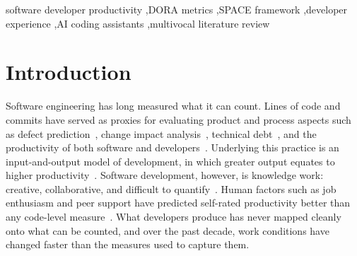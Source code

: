 \documentclass[preprint,number]{elsarticle}
\begin{document}
\begin{frontmatter}
\begin{abstract}
\noindent\textit{\textbf{Conclusion:}}
Across the decade, what changed is less which framework is used than what is measured alongside output. No single framework appears to cover all dimensions of developer productivity. Future studies, especially of AI-assisted work, could combine delivery, perception, and experience measures at the individual, team, and system levels. Validated DevEx instruments, longitudinal designs, and evidence on the team- and system-level effects of AI assistants are still needed.
\end{abstract}

\begin{keyword}
software developer productivity \sep DORA metrics \sep SPACE framework \sep developer experience \sep AI coding assistants \sep multivocal literature review
\end{keyword}

\end{frontmatter}

\linenumbers  %

\section{Introduction}
\label{sec:introduction}

Software engineering has long measured what it can count. Lines of code and commits have served as proxies for evaluating product and process aspects such as defect prediction~\cite{basili1996validation, nagappan2005churn, zimmermann2007predicting}, change impact analysis~\cite{bohner1996impact, arnold1993impact}, technical debt~\cite{cunningham1992wycash, kruchten2012td, seaman2011td}, and the productivity of both software and developers~\cite{boehm1981economics, albrecht1983function, jones1986productivity}. Underlying this practice is an input-and-output model of development, in which greater output equates to higher productivity~\cite{kupiainen2015metrics}. Software development, however, is knowledge work: creative, collaborative, and difficult to quantify~\cite{P1259}. Human factors such as job enthusiasm and peer support have predicted self-rated productivity better than any code-level measure~\cite{P0027}. What developers produce has never mapped cleanly onto what can be counted, and over the past decade, work conditions have changed faster than the measures used to capture them.
\end{document}
